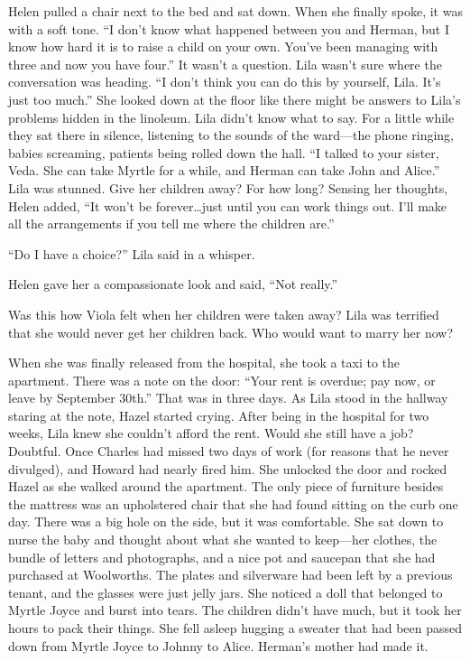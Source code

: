\documentclass[
  american,
  letterpaper,
]{book}
\begin{document}
Helen pulled a chair next to the bed and sat down. When she finally
spoke, it was with a soft tone. ``I don't know what happened between you
and Herman, but I know how hard it is to raise a child on your own.
You've been managing with three and now you have four.'' It wasn't a
question. Lila wasn't sure where the conversation was heading. ``I don't
think you can do this by yourself, Lila. It's just too much.'' She
looked down at the floor like there might be answers to Lila's problems
hidden in the linoleum. Lila didn't know what to say. For a little while
they sat there in silence, listening to the sounds of the ward---the
phone ringing, babies screaming, patients being rolled down the hall.
``I talked to your sister, Veda. She can take Myrtle for a while, and
Herman can take John and Alice.'' Lila was stunned. Give her children
away? For how long? Sensing her thoughts, Helen added, ``It won't be
forever\ldots just until you can work things out. I'll make all the
arrangements if you tell me where the children are.''

``Do I have a choice?'' Lila said in a whisper.

Helen gave her a compassionate look and said, ``Not really.''

Was this how Viola felt when her children were taken away? Lila was
terrified that she would never get her children back. Who would want to
marry her now?

When she was finally released from the hospital, she took a taxi to the
apartment. There was a note on the door: ``Your rent is overdue; pay
now, or leave by September 30th.'' That was in three days. As Lila stood
in the hallway staring at the note, Hazel started crying. After being in
the hospital for two weeks, Lila knew she couldn't afford the rent.
Would she still have a job? Doubtful. Once Charles had missed two days
of work (for reasons that he never divulged), and Howard had nearly
fired him. She unlocked the door and rocked Hazel as she walked around
the apartment. The only piece of furniture besides the mattress was an
upholstered chair that she had found sitting on the curb one day. There
was a big hole on the side, but it was comfortable. She sat down to
nurse the baby and thought about what she wanted to keep---her clothes,
the bundle of letters and photographs, and a nice pot and saucepan that
she had purchased at Woolworths. The plates and silverware had been left
by a previous tenant, and the glasses were just jelly jars. She noticed
a doll that belonged to Myrtle Joyce and burst into tears. The children
didn't have much, but it took her hours to pack their things. She fell
asleep hugging a sweater that had been passed down from Myrtle Joyce to
Johnny to Alice. Herman's mother had made it.
\end{document}
